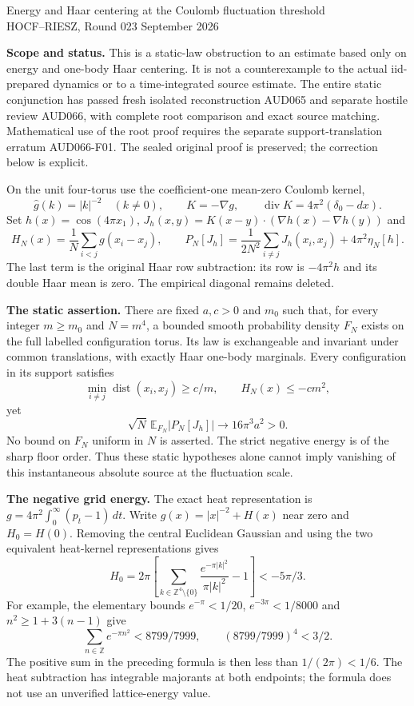 \documentclass[11pt]{article}
\newcommand{\E}{\mathbb E}
\begin{document}
\begin{center}
{\large Energy and Haar centering at the Coulomb fluctuation threshold}\\[4pt]
HOCF--RIESZ, Round 023  September 2026
\end{center}
\noindent\textbf{Scope and status.}
This is a static-law obstruction to an estimate based only on energy and one-body Haar centering. It is not a counterexample to the actual iid-prepared dynamics or to a time-integrated source estimate. The entire static conjunction has passed fresh isolated reconstruction AUD065 and separate hostile review AUD066, with complete root comparison and exact source matching. Mathematical use of the root proof requires the separate support-translation erratum AUD066-F01. The sealed original proof is preserved; the correction below is explicit.

On the unit four-torus use the coefficient-one mean-zero Coulomb kernel,
\[
 \widehat g(k)=|k|^{-2}\quad(k\ne0),\qquad K=-\nabla g,
 \qquad \operatorname{div}K=4\pi^2(\delta_0-dx).
\]
Set $h(x)=\cos(4\pi x_1)$, $J_h(x,y)=K(x-y)\cdot(\nabla h(x)-\nabla h(y))$ and
\[
 H_N(x)=\frac1N\sum_{i<j}g(x_i-x_j),\qquad
 P_N[J_h]=\frac1{2N^2}\sum_{i\ne j}J_h(x_i,x_j)+4\pi^2\eta_N[h].
\]
The last term is the original Haar row subtraction: its row is $-4\pi^2h$ and its double Haar mean is zero. The empirical diagonal remains deleted.

\noindent\textbf{The static assertion.}
There are fixed $a,c>0$ and $m_0$ such that, for every integer $m\ge m_0$ and $N=m^4$, a bounded smooth probability density $F_N$ exists on the full labelled configuration torus. Its law is exchangeable and invariant under common translations, with exactly Haar one-body marginals. Every configuration in its support satisfies
\[
 \min_{i\ne j}\operatorname{dist}(x_i,x_j)\ge c/m,
 \qquad H_N(x)\le-cm^2,
\]
yet
\[
 \sqrt N\,\E_{F_N}|P_N[J_h]|\longrightarrow16\pi^3a^2>0.
\]
No bound on $F_N$ uniform in $N$ is asserted. The strict negative energy is of the sharp floor order. Thus these static hypotheses alone cannot imply vanishing of this instantaneous absolute source at the fluctuation scale.

\noindent\textbf{The negative grid energy.}
The exact heat representation is $g=4\pi^2\int_0^\infty(p_t-1)\,dt$. Write $g(x)=|x|^{-2}+H(x)$ near zero and $H_0=H(0)$. Removing the central Euclidean Gaussian and using the two equivalent heat-kernel representations gives
\[
 H_0=2\pi\left[\sum_{k\in\mathbb Z^4\setminus\{0\}}
 \frac{e^{-\pi|k|^2}}{\pi|k|^2}-1\right]<-5\pi/3.
\]
For example, the elementary bounds $e^{-\pi}<1/20$, $e^{-3\pi}<1/8000$ and $n^2\ge1+3(n-1)$ give
\[
 \sum_{n\in\mathbb Z}e^{-\pi n^2}<8799/7999,
 \qquad (8799/7999)^4<3/2.
\]
The positive sum in the preceding formula is then less than $1/(2\pi)<1/6$. The heat subtraction has integrable majorants at both endpoints; the formula does not use an unverified lattice-energy value.
\end{document}
